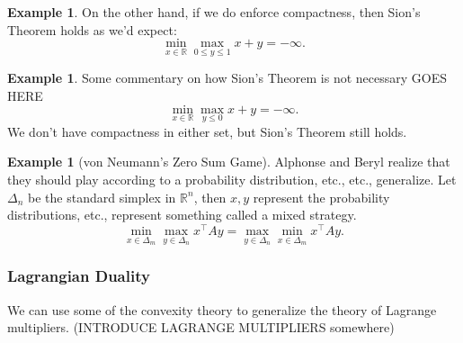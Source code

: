 \documentclass[11pt]{article}
\numberwithin{equation}{section}
\theoremstyle{definition}
\newtheorem{example}[theorem]{Example}
\newcommand{\bR}{\mathbb{R}}
\begin{document}
\begin{example}
    On the other hand, if we do enforce compactness, then Sion's Theorem holds as we'd expect:
    \begin{equation}
        \min_{x\in\bR}\max_{0\le y\le 1} x+y=-\infty.
    \end{equation}
\end{example}
\begin{example}
    Some commentary on how Sion's Theorem is not necessary GOES HERE
    \begin{equation}
        \min_{x\in\bR}\max_{y\le 0} x+y=-\infty.
    \end{equation}
    We don't have compactness in either set, but Sion's Theorem still holds.
\end{example}
\begin{example}[von Neumann's Zero Sum Game]
    Alphonse and Beryl realize that they should play according to a probability distribution, etc., etc., generalize. Let $\Delta_n$ be the standard simplex in $\bR^n$, then $x, y$ represent the probability distributions, etc., represent something called a mixed strategy.
    \begin{equation}
         \min_{x\in\Delta_m}\max_{y\in\Delta_n} x^\top Ay=\max_{y\in\Delta_n}\min_{x\in\Delta_m} x^\top Ay.
    \end{equation}
\end{example}
\subsubsection{Lagrangian Duality}
We can use some of the convexity theory to generalize the theory of Lagrange multipliers. (INTRODUCE LAGRANGE MULTIPLIERS somewhere)
\end{document}
